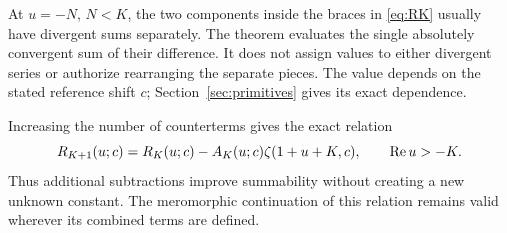 \begin{remark}
At $u=-N$, $N<K$, the two components inside the braces in
\eqref{eq:RK} usually have divergent sums separately.  The theorem evaluates
the single absolutely convergent sum of their difference.  It does not
assign values to either divergent series or authorize rearranging the
separate pieces.  The value depends on the stated reference shift $c$;
Section~\ref{sec:primitives} gives its exact dependence.
\end{remark}

Increasing the number of counterterms gives the exact relation
\begin{equation}\label{eq:Krec}
 R_{K+1}(u;c)=R_K(u;c)-A_K(u;c)\zeta(1+u+K,c),
 \qquad \operatorname{Re} u>-K.
\end{equation}
Thus additional subtractions improve summability without creating a new
unknown constant.  The meromorphic continuation of this relation remains
valid wherever its combined terms are defined.
